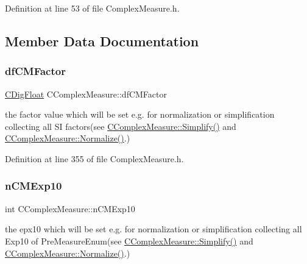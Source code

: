 Definition at line 53 of file Complex\+Measure.\+h.



\subsection{Member Data Documentation}
\mbox{\label{classCComplexMeasure_a21eecd9fd837fb73da2e6994b6c3fefe}} 
\subsubsection{\texorpdfstring{df\+C\+M\+Factor}{dfCMFactor}}
{\footnotesize\ttfamily \hyperlink{classCDigFloat}{C\+Dig\+Float} C\+Complex\+Measure\+::df\+C\+M\+Factor\hspace{0.3cm}{\ttfamily [protected]}}



the factor value which will be set e.\+g. for normalization or simplification collecting all SI factors(see \hyperlink{classCComplexMeasure_addb4e69033f2c32fb3bf4a3aef5e1470}{C\+Complex\+Measure\+::\+Simplify()} and \hyperlink{classCComplexMeasure_a87cc1f3c3f0dafd7cbe00634124c8d46}{C\+Complex\+Measure\+::\+Normalize()}.) 



Definition at line 355 of file Complex\+Measure.\+h.

\mbox{\label{classCComplexMeasure_a52cfbd26747c0497cfe97c56f2ff38ea}} 
\subsubsection{\texorpdfstring{n\+C\+M\+Exp10}{nCMExp10}}
{\footnotesize\ttfamily int C\+Complex\+Measure\+::n\+C\+M\+Exp10\hspace{0.3cm}{\ttfamily [protected]}}



the epx10 which will be set e.\+g. for normalization or simplification collecting all Exp10 of Pre\+Measure\+Enum(see \hyperlink{classCComplexMeasure_addb4e69033f2c32fb3bf4a3aef5e1470}{C\+Complex\+Measure\+::\+Simplify()} and \hyperlink{classCComplexMeasure_a87cc1f3c3f0dafd7cbe00634124c8d46}{C\+Complex\+Measure\+::\+Normalize()}.) 



